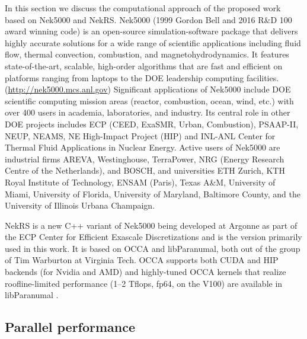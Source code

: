 \documentclass[11pt,letterpaper,english]{article}
\begin{document}
In this section we discuss the computational approach of the proposed work based on Nek5000 and NekRS.
%
Nek5000 (1999 Gordon Bell and 2016 R\&D 100 award winning code) is an
open-source simulation-software package that delivers highly accurate solutions
for a wide range of scientific applications including fluid flow, thermal
convection, combustion, and magnetohydrodynamics. It features state-of-the-art,
scalable, high-order algorithms that are fast and efficient on platforms
ranging from laptops to the DOE leadership computing facilities.
({\footnotesize\url{http://nek5000.mcs.anl.gov}})
   Significant applications of Nek5000 include DOE scientific
computing mission areas (reactor, combustion, ocean, wind, etc.) with over 400
users in academia, laboratories, and industry. Its central role in other DOE
projects includes  ECP (CEED, ExaSMR, Urban, Combustion), PSAAP-II, NEUP, NEAMS, NE
High-Impact Project (HIP) and  INL-ANL Center for Thermal Fluid Applications in
Nuclear Energy.
   Active users of Nek5000 are industrial firms AREVA, Westinghouse,
TerraPower, NRG (Energy Research Centre of the Netherlands), and BOSCH, and
universities ETH Zurich, KTH Royal Institute of Technology, ENSAM (Paris),
Texas A\&M, University of Miami, University of Florida, University of Maryland,
Baltimore County, and the University of Illinois Urbana Champaign.

NekRS is a new C++ variant of Nek5000 being developed at Argonne as part of the
ECP Center for Efficient Exascale Discretizations and is the version primarily
used in this work.  It is based
on OCCA and libParanumal, both out of the group of Tim Warburton at
Virginia Tech.  OCCA supports both CUDA and HIP backends (for Nvidia and AMD)
and highly-tuned OCCA kernels that realize roofline-limited performance
(1--2 Tflops, fp64, on the V100) are available in libParanumal \cite{fischer20a}.

\vspace{-.25in}
\subsection{Parallel performance}
\vspace{-.2in}
\end{document}
